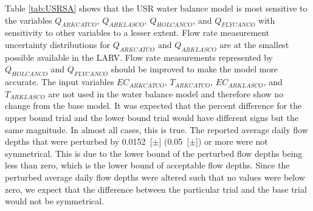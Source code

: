 \begin{linenumbers}
Table \ref{tab:USRSA} shows that the USR water balance model is most sensitive to the variables $ Q_{ARKCATCO} $, $ Q_{ARKLASCO} $, $ Q_{HOLCANCO} $, and $ Q_{FLYCANCO} $ with sensitivity to other variables to a lesser extent.  Flow rate measurement uncertainty distributions for $ Q_{ARKCATCO} $ and $ Q_{ARKLASCO} $ are at the smallest possible available in the LARV.  Flow rate measurements represented by $ Q_{HOLCANCO} $ and $ Q_{FLYCANCO} $ should be improved to make the model more accurate.  The input variables $ EC_{ARKCATCO} $, $ T_{ARKCATCO} $, $ EC_{ARKLASCO} $, and $ T_{ARKLASCO} $ are not used in the water balance model and therefore show no change from the base model.  It was expected that the percent difference for the upper bound trial and the lower bound trial would have different signs but the same magnitude.  In almost all cases, this is true.  The reported average daily flow depths that were perturbed by \SI{0.0152}[$ \pm $]{\meter} (\SI{0.05}[$ \pm $]{\foot}) or more were not symmetrical.  This is due to the lower bound of the perturbed flow depths being less than zero, which is the lower bound of acceptable flow depths.  Since the perturbed average daily flow depths were altered such that no values were below zero, we expect that the difference between the particular trial and the base trial would not be symmetrical.


\end{linenumbers}
